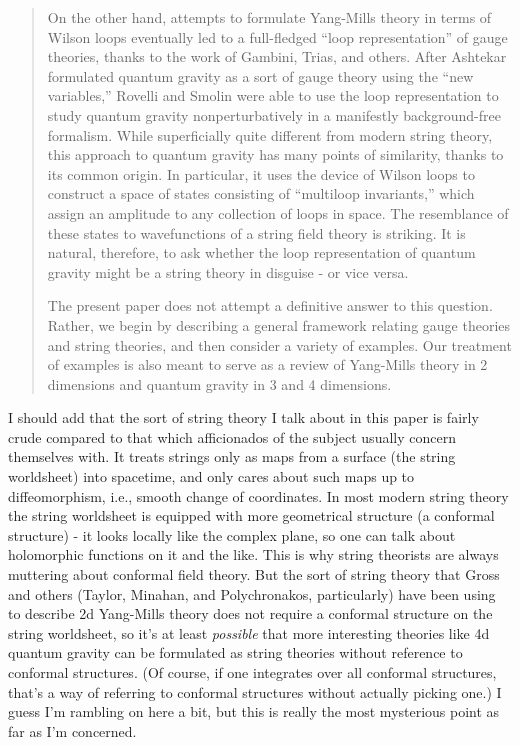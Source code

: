 \documentclass{article}
\begin{document}
\begin{quote}
On the other hand, attempts to formulate Yang-Mills theory in terms of
Wilson loops eventually led to a full-fledged ``loop representation'' of
gauge theories, thanks to the work of Gambini, Trias, and others. After
Ashtekar formulated quantum gravity as a sort of gauge theory using the
``new variables,'' Rovelli and Smolin were able to use the loop
representation to study quantum gravity nonperturbatively in a
manifestly background-free formalism. While superficially quite
different from modern string theory, this approach to quantum gravity
has many points of similarity, thanks to its common origin. In
particular, it uses the device of Wilson loops to construct a space of
states consisting of ``multiloop invariants,'' which assign an amplitude
to any collection of loops in space. The resemblance of these states to
wavefunctions of a string field theory is striking. It is natural,
therefore, to ask whether the loop representation of quantum gravity
might be a string theory in disguise - or vice versa.

The present paper does not attempt a definitive answer to this question.
Rather, we begin by describing a general framework relating gauge
theories and string theories, and then consider a variety of examples.
Our treatment of examples is also meant to serve as a review of
Yang-Mills theory in 2 dimensions and quantum gravity in 3 and 4
dimensions.
\end{quote}

I should add that the sort of string theory I talk about in this paper
is fairly crude compared to that which afficionados of the subject
usually concern themselves with. It treats strings only as maps from a
surface (the string worldsheet) into spacetime, and only cares about
such maps up to diffeomorphism, i.e., smooth change of coordinates. In
most modern string theory the string worldsheet is equipped with more
geometrical structure (a conformal structure) - it looks locally like
the complex plane, so one can talk about holomorphic functions on it and
the like. This is why string theorists are always muttering about
conformal field theory. But the sort of string theory that Gross and
others (Taylor, Minahan, and Polychronakos, particularly) have been
using to describe 2d Yang-Mills theory does not require a conformal
structure on the string worldsheet, so it's at least \emph{possible}
that more interesting theories like 4d quantum gravity can be formulated
as string theories without reference to conformal structures. (Of
course, if one integrates over all conformal structures, that's a way of
referring to conformal structures without actually picking one.) I guess
I'm rambling on here a bit, but this is really the most mysterious point
as far as I'm concerned.
\end{document}
